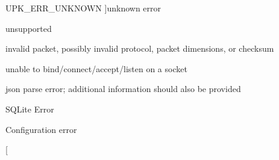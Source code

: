 \begin{Desc}
\begin{description}
{UPK\_\-ERR\_\-UNKNOWN\label{tp_8c_ga0abba5d980180c5f12823c366a12020aa8615449e0673546bd4efd9b3ef92fb1c}
}]unknown error \item[{\em 
UPK\_\-ERR\_\-UNSUP\label{tp_8c_ga0abba5d980180c5f12823c366a12020aa8cf76a288b9a273b8b40dfcdbc25c619}
}]unsupported \item[{\em 
UPK\_\-ERR\_\-INVALID\_\-PKT\label{tp_8c_ga0abba5d980180c5f12823c366a12020aa7c6c8e23f4e0f07190ea70b9555868ab}
}]invalid packet, possibly invalid protocol, packet dimensions, or checksum \item[{\em 
UPK\_\-SOCKET\_\-FAILURE\label{tp_8c_ga0abba5d980180c5f12823c366a12020aa8aa6de73b0042e07d3793da091cab2c9}
}]unable to bind/connect/accept/listen on a socket \item[{\em 
UPK\_\-JSON\_\-PARSE\_\-ERROR\label{tp_8c_ga0abba5d980180c5f12823c366a12020aa0df92a123484dbef1d2f12d381dc52e9}
}]json parse error; additional information should also be provided \item[{\em 
UPK\_\-SQL\_\-ERROR\label{tp_8c_ga0abba5d980180c5f12823c366a12020aa596742161cd5ae35955b3e1baab5a999}
}]SQLite Error \item[{\em 
UPK\_\-CONF\_\-ERROR\label{tp_8c_ga0abba5d980180c5f12823c366a12020aa0541e0eaeb37bd29c74319cac488dff1}
}]Configuration error \item[{\em 
UPK\_\-ERR\_\-UNKNOWN\label{tp_8c_ga0abba5d980180c5f12823c366a12020aa8615449e0673546bd4efd9b3ef92fb1c}
}]\item[{\em 
}
\end{description}
\end{Desc}
